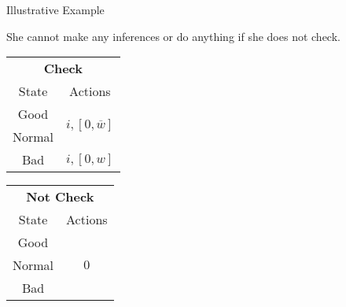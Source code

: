 \documentclass[usenames,dvipsnames,aspectratio=169,11pt, envcountsect, handout]{beamer}
\begin{document}
\begin{frame}[noframenumbering]{Illustrative Example}

	She cannot make any inferences or do anything if she does not check. \pause

	\vfill

	\begin{table}[H]
		\centering
		\begin{minipage}{0.29\textwidth}

		\end{minipage}\hspace{0.3cm} %
		\begin{minipage}{0.29\textwidth}
			\centering
			\begin{tabular}{c | c}
				\multicolumn{2}{c}{\textbf{Check}}                                                            \\
				State                & Actions                                                                \\
				\hline
				{\color{blue}Good}   & \multirow{2}{*}{{\color{blue}\( i, \left[ 0, \overline{w} \right] \)}} \\
				{\color{blue}Normal} &                                                                        \\
				Bad                  & \(  i, \left[0, w \right] \)                                           \\
			\end{tabular}
			\vspace{0.5cm} %
		\end{minipage}\hspace{0.7cm} %
		\begin{minipage}{0.29\textwidth}
			\centering
			\begin{tabular}{c | c}
				\multicolumn{2}{c}{\textbf{Not Check}} \\
				State  & Actions                       \\
				\hline
				Good   & \multirow{3}{*}{ \( 0 \)}     \\
				Normal &                               \\
				Bad    &                               \\
			\end{tabular}
			\vspace{0.5cm} %
		\end{minipage}
	\end{table}

\end{frame}
\end{document}
